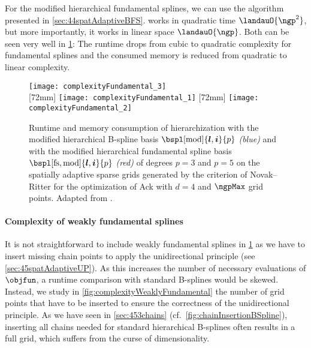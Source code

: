 For the modified hierarchical fundamental splines,
we can use the \bfs algorithm presented in \cref{sec:44spatAdaptiveBFS}.
\bfs works in quadratic time $\landauO{\ngp^2}$, but more importantly,
it works in linear space $\landauO{\ngp}$.
Both can be seen very well in \cref{fig:complexityFundamental}:
The runtime drops from cubic to quadratic complexity for fundamental splines
and the consumed memory is reduced from quadratic to linear complexity.

\begin{figure}
  \texttt{[image: complexityFundamental\_3]}\\[2mm]%
  [72mm]{%
    \texttt{[image: complexityFundamental\_1]}%
  }%
  \hfill%
  [72mm]{%
    \texttt{[image: complexityFundamental\_2]}%
  }%
  \caption[Complexity of fundamental splines]{%
    Runtime and memory consumption of hierarchization
    with the modified hierarchical B-spline basis
    $\bspl[\modified]{\*l,\*i}{p}$ \emph{\textcolor{C0}{(blue)}} and
    with the modified hierarchical fundamental spline basis
    $\bspl[\fs,\modified]{\*l,\*i}{p}$ \emph{\textcolor{C1}{(red)}}
    of degrees $p = 3$ and $p = 5$
    on the spatially adaptive sparse grids generated by the criterion of
    Novak--Ritter for the optimization of Ack with $d = 4$ and
    $\ngpMax$ grid points.
    Adapted from \cite{Valentin18Fundamental}.%
  }%
  \label{fig:complexityFundamental}%
\end{figure}

\paragraph{Complexity of weakly fundamental splines}

It is not straightforward to include weakly fundamental splines
in \cref{fig:complexityFundamental} as we have to insert missing
chain points to apply the unidirectional principle
(see \cref{sec:45spatAdaptiveUP}).
As this increases the number of necessary evaluations of $\objfun$,
a runtime comparison with standard B-splines would be skewed.
Instead, we study in \cref{fig:complexityWeaklyFundamental}
the number of grid points that have to be inserted
to ensure the correctness of the unidirectional principle.
As we have seen in \cref{sec:453chains}
(cf.\ \cref{fig:chainInsertionBSpline}),
inserting all chains needed for standard hierarchical B-splines
often results in a full grid, which suffers from the curse of dimensionality.

